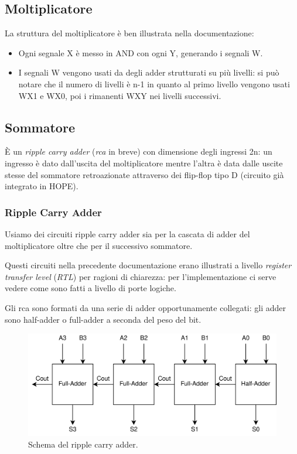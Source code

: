 \documentclass[12pt, letterpaper]{article}
\begin{document}
\newpage
\subsection{Moltiplicatore}
La struttura del moltiplicatore è ben illustrata nella documentazione:

\begin{itemize}
  \item Ogni segnale X è messo in AND con ogni Y, generando i segnali W.
  \item I segnali W vengono usati da degli adder strutturati su più livelli: si può notare che il numero di livelli è n-1 in quanto al primo livello vengono usati WX1 e WX0, poi i rimanenti WXY nei livelli successivi.
\end{itemize}

\subsection{Sommatore}
È un \textit{ripple carry adder} (\textit{rca} in breve) con dimensione degli ingressi 2n: un ingresso è dato dall'uscita del moltiplicatore mentre l'altra è data dalle uscite stesse del sommatore retroazionate attraverso dei flip-flop tipo D (circuito già integrato in HOPE).

\subsubsection{Ripple Carry Adder}

Usiamo dei circuiti ripple carry adder sia per la cascata di adder del moltiplicatore oltre che per il successivo sommatore.

Questi circuiti nella precedente documentazione erano illustrati a livello \textit{register transfer level} (\textit{RTL}) per ragioni di chiarezza: per l'implementazione ci serve vedere come sono fatti a livello di porte logiche.

Gli rca sono formati da una serie di adder opportunamente collegati: gli adder sono half-adder o full-adder a seconda del peso del bit.

\begin{figure}
\centering
\includegraphics[width=\textwidth]{ripple_carry_adder}
\caption{Schema del ripple carry adder.}
\label{rca}
\end{figure}
\end{document}
